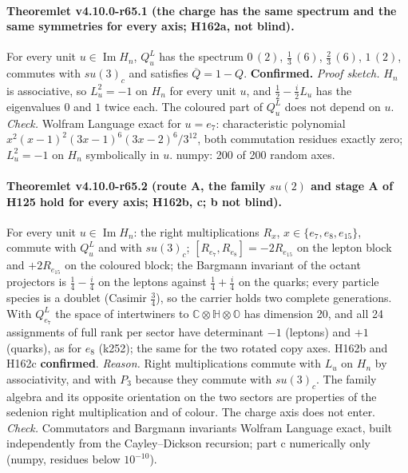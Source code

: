 \paragraph{Theoremlet v4.10.0-r65.1 (the charge has the same spectrum and the same symmetries for every axis; H162a, not blind).}
For every unit \(u\in\operatorname{Im}H_n\), \(Q^L_u\) has the spectrum \(0\,(2)\), \(\tfrac13\,(6)\), \(\tfrac23\,(6)\), \(1\,(2)\), commutes with
\(su(3)_c\) and satisfies \(\overline{Q}=1-Q\).  \textbf{Confirmed.}
\emph{Proof sketch.}  \(H_n\) is associative, so \(L_u^2=-1\) on \(H_n\) for every unit \(u\), and \(\tfrac12-\tfrac i2L_u\) has the eigenvalues
\(0\) and \(1\) twice each.  The coloured part of \(Q^L_u\) does not depend on \(u\).
\emph{Check.} Wolfram Language exact for \(u=e_7\): characteristic polynomial \(x^2(x-1)^2(3x-1)^6(3x-2)^6/3^{12}\), both commutation residues
exactly zero; \(L_u^2=-1\) on \(H_n\) symbolically in \(u\).  numpy: 200 of 200 random axes.

\paragraph{Theoremlet v4.10.0-r65.2 (route A, the family \(su(2)\) and stage A of H125 hold for every axis; H162b, c; b not blind).}
For every unit \(u\in\operatorname{Im}H_n\): the right multiplications \(R_x\), \(x\in\{e_7,e_8,e_{15}\}\), commute with \(Q^L_u\) and with
\(su(3)_c\); \([R_{e_7},R_{e_8}]=-2R_{e_{15}}\) on the lepton block and \(+2R_{e_{15}}\) on the coloured block; the Bargmann invariant of the octant
projectors is \(\tfrac14-\tfrac i4\) on the leptons against \(\tfrac14+\tfrac i4\) on the quarks; every particle species is a doublet (Casimir
\(\tfrac34\)), so the carrier holds two complete generations.  With \(Q^L_{e_7}\) the space of intertwiners to
\(\mathbb C\otimes\mathbb H\otimes\mathbb O\) has dimension 20, and all 24 assignments of full rank per sector have determinant \(-1\) (leptons) and
\(+1\) (quarks), as for \(e_8\) (k252); the same for the two rotated copy axes.  H162b and H162c \textbf{confirmed}.
\emph{Reason.}  Right multiplications commute with \(L_u\) on \(H_n\) by associativity, and with \(P_3\) because they commute with \(su(3)_c\).  The
family algebra and its opposite orientation on the two sectors are properties of the sedenion right multiplication and of colour.  The charge
axis does not enter.
\emph{Check.} Commutators and Bargmann invariants Wolfram Language exact, built independently from the Cayley--Dickson recursion; part c numerically
only (numpy, residues below \(10^{-10}\)).

